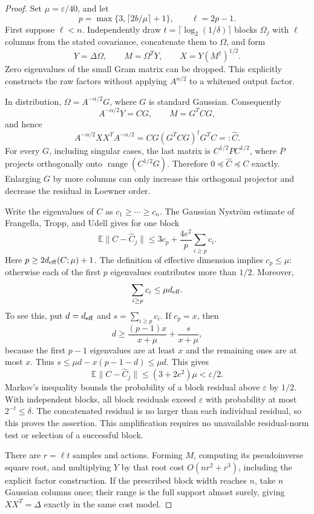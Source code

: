 \documentclass[11pt]{article}
\begin{document}
\begin{proof}
Set $\mu=\varepsilon/40$, and let
\[
 p=\max\{3,\lceil2b/\mu\rceil+1\},\qquad \ell=2p-1.
\]
First suppose $\ell<n$.  Independently draw $t=\lceil\log_2(1/\delta)\rceil$
blocks $\Omega_j$ with $\ell$ columns from the stated covariance,
concatenate them to $\Omega$, and form
\[
 Y=\Delta\Omega,\qquad M=\Omega^TY,\qquad
 X=Y(M^\dagger)^{1/2}.
\]
Zero eigenvalues of the small Gram matrix can be dropped.
This explicitly constructs the raw factors without applying
$A^{\alpha/2}$ to a whitened output factor.

In distribution, $\Omega=A^{-\alpha/2}G$, where $G$ is standard
Gaussian.  Consequently
\[
 A^{-\alpha/2}Y=CG,\qquad M=G^TCG,
\]
and hence
\[
 A^{-\alpha/2}XX^TA^{-\alpha/2}
       =CG(G^TCG)^\dagger G^TC=:\widehat C.
\]
For every $G$, including singular cases, the last matrix is
$C^{1/2}P C^{1/2}$, where $P$ projects orthogonally onto
$\operatorname{range}(C^{1/2}G)$.  Therefore
$0\preceq\widehat C\preceq C$ exactly.  Enlarging $G$ by more columns
can only increase this orthogonal projector and decrease the residual
in Loewner order.

Write the eigenvalues of $C$ as $c_1\ge\cdots\ge c_n$.  The
Gaussian Nystr\"om estimate of Frangella, Tropp, and Udell
\cite[Corollary 2.3]{FTU} gives for one block
\[
 \mathbb E\|C-\widehat C_j\|
 \le 3c_p+\frac{4e^2}{p}\sum_{i\ge p}c_i.
\]
Here $p\ge2d_{\rm eff}(C;\mu)+1$.  The definition of effective
dimension implies $c_p\le\mu$: otherwise each of the first $p$
eigenvalues contributes more than $1/2$.  Moreover,
\[
 \sum_{i\ge p}c_i\le\mu d_{\rm eff}.
\]
To see this, put $d=d_{\rm eff}$ and $s=\sum_{i\ge p}c_i$.
If $c_p=x$, then
\[
 d\ge \frac{(p-1)x}{x+\mu}
             +\frac{s}{x+\mu},
\]
because the first $p-1$ eigenvalues are at least $x$ and the remaining
ones are at most $x$.  Thus
$s\le\mu d-x(p-1-d)\le\mu d$.
This gives
\[
 \mathbb E\|C-\widehat C_j\|
 \le(3+2e^2)\mu<\varepsilon/2.
\]
Markov's inequality bounds the probability of a block residual above
$\varepsilon$ by $1/2$.  With independent blocks, all block residuals
exceed $\varepsilon$ with probability at most $2^{-t}\le\delta$.
The concatenated residual is no larger than each individual residual,
so this proves the assertion.  This amplification requires no
unavailable residual-norm test or selection of a successful block.

There are $r=\ell t$ samples and actions.  Forming $M$, computing
its pseudoinverse square root, and multiplying $Y$ by that root cost
$O(nr^2+r^3)$, including the explicit factor construction.  If the
prescribed block width reaches $n$, take $n$ Gaussian columns once;
their range is the full support almost surely, giving $XX^T=\Delta$
exactly in the same cost model.
\end{proof}
\end{document}
